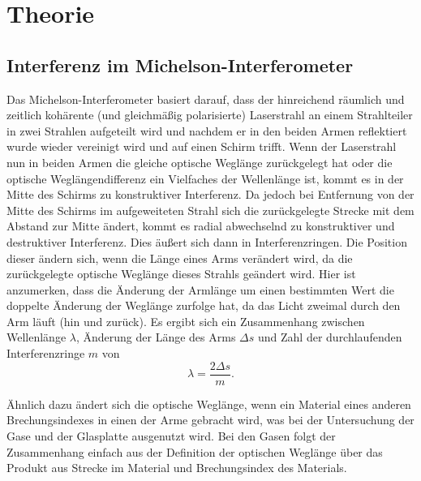 \documentclass[
	a4paper,
	12pt,
	pagesize,
	ngerman
]{scrartcl}
\begin{document}
	\section{Theorie}
	\subsection{Interferenz im Michelson-Interferometer}
	Das Michelson-Interferometer basiert darauf, dass der hinreichend räumlich und zeitlich kohärente (und gleichmäßig polarisierte) Laserstrahl an einem Strahlteiler in zwei Strahlen aufgeteilt wird und nachdem er in den beiden Armen reflektiert wurde wieder vereinigt wird und auf einen Schirm trifft.
	Wenn der Laserstrahl nun in beiden Armen die gleiche optische Weglänge zurückgelegt hat oder die optische Weglängendifferenz ein Vielfaches der Wellenlänge ist, kommt es in der Mitte des Schirms zu konstruktiver Interferenz.
	Da jedoch bei Entfernung von der Mitte des Schirms im aufgeweiteten Strahl sich die zurückgelegte Strecke mit dem Abstand zur Mitte ändert, kommt es radial abwechselnd zu konstruktiver und destruktiver Interferenz.
	Dies äußert sich dann in Interferenzringen.
	Die Position dieser ändern sich, wenn die Länge eines Arms verändert wird, da die zurückgelegte optische Weglänge dieses Strahls geändert wird.
	Hier ist anzumerken, dass die Änderung der Armlänge um einen bestimmten Wert die doppelte Änderung der Weglänge zurfolge hat, da das Licht zweimal durch den Arm läuft (hin und zurück).
	Es ergibt sich ein Zusammenhang zwischen Wellenlänge $\lambda$, Änderung der Länge des Arms $\Delta s$ und Zahl der durchlaufenden Interferenzringe $m$ von %
	\begin{equation}
		\lambda = \frac{2 \Delta s}{m}.
		\label{eq_wellenlaenge}
	\end{equation}

	Ähnlich dazu ändert sich die optische Weglänge, wenn ein Material eines anderen Brechungsindexes in einen der Arme gebracht wird, was bei der Untersuchung der Gase und der Glasplatte ausgenutzt wird.
	Bei den Gasen folgt der Zusammenhang einfach aus der Definition der optischen Weglänge über das Produkt aus Strecke im Material und Brechungsindex des Materials.
\end{document}

